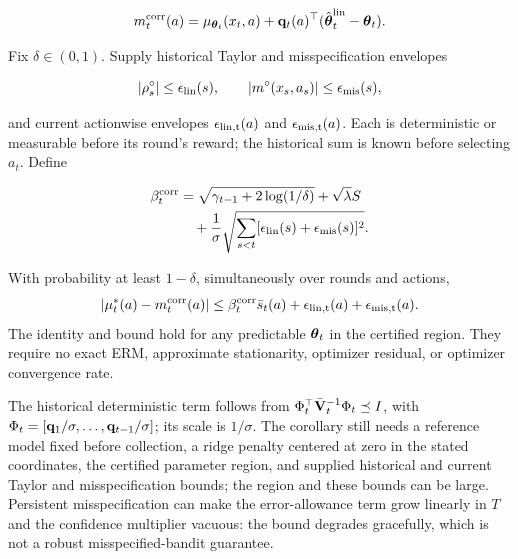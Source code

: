 \begin{equation}\label{eq:corrected-center-new}
 m_t^{\rm corr}(a)=\mu_{\boldsymbol{\theta}_t}(x_t,a)
 +\mathbf{q}_t(a)^\top(\hat{\boldsymbol{\theta}}_t^{\rm lin}-\boldsymbol{\theta}_t).
\end{equation}

Fix $\delta\in(0,1)$. Supply historical Taylor and misspecification
envelopes

\begin{equation}\label{eq:lin-mis-envelopes-new}
 |\rho_s^\circ|\le\epsilon_{\rm lin}(s),\qquad
 |m^\circ(x_s,a_s)|\le\epsilon_{\rm mis}(s),
\end{equation}

and current actionwise envelopes $\epsilon_{\rm lin,t}(a)$ and
$\epsilon_{\rm mis,t}(a)$. Each is deterministic or measurable before its
round's reward; the historical sum is known before selecting $a_t$. Define

\begin{equation}\label{eq:beta-corrected-new}
 \begin{aligned}
  \beta_t^{\rm corr}
  &=\sqrt{\gamma_{t-1}+2\log(1/\delta)}+\sqrt\lambda S\\
  &\quad+\frac1\sigma\sqrt{\sum_{s<t}
  [\epsilon_{\rm lin}(s)+\epsilon_{\rm mis}(s)]^2}.
 \end{aligned}
\end{equation}

\begin{corollary}
\label{cor:corrected-center-new}
With probability at least $1-\delta$, simultaneously over rounds and actions,
\begin{equation}\label{eq:corrected-confidence-new}
 |\mu_t^*(a)-m_t^{\rm corr}(a)|
 \le\beta_t^{\rm corr}\bar s_t(a)
 +\epsilon_{\rm lin,t}(a)+\epsilon_{\rm mis,t}(a).
\end{equation}
The identity and bound hold for any predictable $\boldsymbol{\theta}_t$ in the certified
region.  They require no exact ERM, approximate stationarity, optimizer
residual, or optimizer convergence rate.
\end{corollary}

The historical deterministic term follows from
$\Phi_t^\top\bar{\mathbf{V}}_t^{-1}\Phi_t\preceq I$, with
$\Phi_t=[\mathbf{q}_1/\sigma,\ldots,\mathbf{q}_{t-1}/\sigma]$; its scale is $1/\sigma$.
The corollary still needs a reference model fixed before collection, a ridge
penalty centered at zero in the stated coordinates, the certified parameter
region, and supplied historical and current Taylor and misspecification
bounds; the region and these bounds can be large. Persistent misspecification can make the error-allowance
term grow linearly in $T$ and the confidence multiplier vacuous: the bound
degrades gracefully, which is not a robust misspecified-bandit guarantee.

